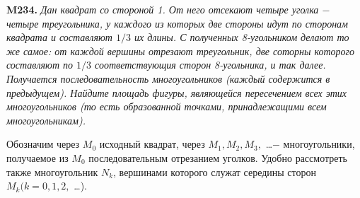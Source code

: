 

%
\begin{minipage}[t]{0,5\linewidth}

\noindent\textbf{M234.} \emph{Дан квадрат со стороной 1. От него отсекают четыре уголка $-$ четыре треугольника, у каждого из которых две стороны идут по сторонам квадрата и составляют $1/3$ их длины. С полученных 8-угольником делают то же самое: от каждой вершины отрезают треугольник, две соторны которого составляют по $1/3$ соответствующия сторон 8-угольника, и так далее. Получается последовательность многоугольников (каждый содержится в предыдущем). Найдите площадь фигуры, являющейся пересечением всех этих многоугольников (то есть образованной точками, принадлежащими всем многоугольникам).}

\bigskip

\setlength{\parindent}{7ex}Обозначим через $M_0$ исходный квадрат, через \hspace{2mm}$M_1, M_2, M_3,$ \ldots $-$ многоугольники, получаемое из $M_0$ последовательным отрезанием уголков. Удобно рассмотреть также многоугольник $N_k$, вершинами которого служат середины сторон $M_k (k =  0, 1, 2,$ \ldots).


\end{minipage}
